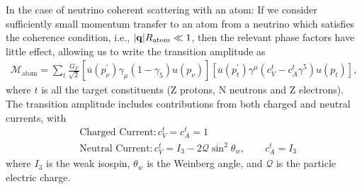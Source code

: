 In the case of neutrino coherent scattering with an atom: If we consider sufficiently small momentum transfer to an atom from a neutrino which satisfies the coherence condition, i.e., $|\bold{q}|R_{\mathrm{atom}}\ll1$, then the relevant phase factors have little effect, allowing us to write the transition amplitude as \cite{Nicolescu:2013rxa}
\begin{align}
\label{M_atom}
\mathcal{M}_\mathrm{atom}=\sum_t\frac{G_F}{\sqrt{2}}\left[\overline{u}(p^\prime_\nu)\gamma_\mu\left(1-\gamma_5\right)u(p_\nu)\right]\left[\overline{u}(p^\prime_t)\gamma^\mu\left(c^t_V-c^t_A\gamma^5\right)u(p_t)\right],
\end{align}
where $t$ is all the target constituents (Z protons, N neutrons and Z electrons). The transition amplitude includes contributions from both charged and neutral currents, with
\begin{align}\label{CC_int}
&\mathrm{Charged\,\,Current}: c^t_V=c^t_A=1\\
\label{NC_int}
&\mathrm{Neutral\,\, Current}: c^t_V=I_3-2\mathcal{Q}\sin^2\theta_w,\qquad c^t_A=I_3
\end{align}
where $I_3$ is the weak isospin, $\theta_w$ is the Weinberg angle, and $\mathcal{Q}$ is the particle electric charge. 

